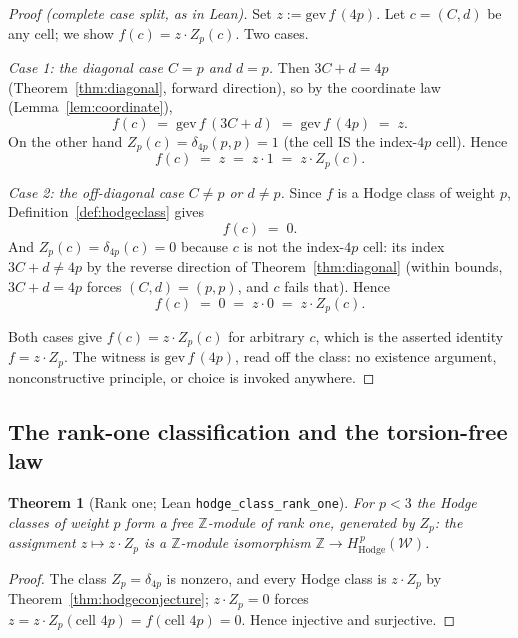 \documentclass[11pt,a4paper]{article}
\theoremstyle{plain}
\newtheorem{theorem}{Theorem}[section]
\theoremstyle{definition}
\newcommand{\Z}{\mathbb{Z}}
\newcommand{\cycleClass}[1]{Z_{#1}}
\begin{document}
\begin{proof}[Proof (complete case split, as in Lean)]
Set $z := \mathrm{gev}\,f\,(4p)$. Let $c = (C,d)$ be any cell; we show
$f(c) = z\cdot\cycleClass{p}(c)$. Two cases.

\emph{Case 1: the diagonal case $C = p$ and $d = p$.}
Then $3C + d = 4p$ (Theorem~\ref{thm:diagonal}, forward direction), so by the
coordinate law (Lemma~\ref{lem:coordinate}),
\[
  f(c) \;=\; \mathrm{gev}\,f\,(3C+d) \;=\; \mathrm{gev}\,f\,(4p) \;=\; z.
\]
On the other hand $\cycleClass{p}(c) = \delta_{4p}(p,p) = 1$ (the cell IS the
index-$4p$ cell). Hence
\[
  f(c) \;=\; z \;=\; z\cdot 1 \;=\; z \cdot \cycleClass{p}(c).
\]

\emph{Case 2: the off-diagonal case $C \ne p$ or $d \ne p$.}
Since $f$ is a Hodge class of weight $p$, Definition~\ref{def:hodgeclass}
gives
\[
  f(c) \;=\; 0.
\]
And $\cycleClass{p}(c) = \delta_{4p}(c) = 0$ because $c$ is not the
index-$4p$ cell: its index $3C+d \ne 4p$ by the reverse direction of
Theorem~\ref{thm:diagonal} (within bounds, $3C+d = 4p$ forces
$(C,d)=(p,p)$, and $c$ fails that). Hence
\[
  f(c) \;=\; 0 \;=\; z \cdot 0 \;=\; z \cdot \cycleClass{p}(c).
\]

Both cases give $f(c) = z\cdot\cycleClass{p}(c)$ for arbitrary $c$, which is
the asserted identity $f = z\cdot\cycleClass{p}$. The witness is
$\mathrm{gev}\,f\,(4p)$, read off the class: no existence argument,
nonconstructive principle, or choice is invoked anywhere.
\end{proof}

\subsection{The rank-one classification and the torsion-free law}

\begin{theorem}[Rank one; Lean \texttt{hodge\_class\_rank\_one}]
\label{thm:rankone}
For $p<3$ the Hodge classes of weight $p$ form a free $\Z$-module of rank
one, generated by $\cycleClass{p}$: the assignment
$z \mapsto z\cdot\cycleClass{p}$ is a $\Z$-module isomorphism
$\Z \to H^{\,p}_{\mathrm{Hodge}}(\mathcal{W})$.
\end{theorem}

\begin{proof}
The class $\cycleClass{p} = \delta_{4p}$ is nonzero, and every Hodge class is
$z\cdot\cycleClass{p}$ by Theorem~\ref{thm:hodgeconjecture};
$z\cdot\cycleClass{p} = 0$ forces
$z = z\cdot\cycleClass{p}(\text{cell }4p) = f(\text{cell }4p) = 0$. Hence
injective and surjective.
\end{proof}
\end{document}
